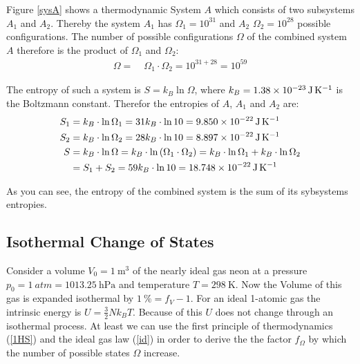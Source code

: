 \documentclass[11pt,a4paper]{scrartcl}
\newcommand{\Ln}[1]{\text{ln}\left( #1 \right)}			%
\newcommand{\eref}[1]{(\ref{#1})}						%
\begin{document}
Figure \ref{sysA} shows a thermodynamic System $A$ which consists of two subsystems $A_1$ and $A_2$. 
Thereby the system $A_1$ has $\Omega_1=10^{31}$ and $A_2$ $\Omega_2=10^{28}$ possible configurations. 
The number of possible configurations $\Omega$ of the combined system $A$ therefore is the product of $\Omega_1$ and $\Omega_2$:
\begin{align}
\Omega 
	=&\; \Omega_1\cdot\Omega_2 
	= 10^{31+28} = 10^{59}
	\label{omega}
\end{align}

The entropy of such a system is $S=k_B \ln \Omega$, where $k_B=\SI{1.38E-23}{\joule\per\kelvin}$ is the Boltzmann constant. 
Therefor the entropies of $A$, $A_1$ and $A_2$ are:
\begin{align}
S_1 
	=&\; k_B\cdot \ln\Omega_1 
	= 31 k_B\cdot\ln 10  
	= \SI{9.850E-22}{\joule\per\kelvin}
	\label{S1}\\
S_2 
	=&\; k_B\cdot \ln\Omega_2 
	= 28 k_B\cdot\ln 10 
	= \SI{8.897E-22}{\joule\per\kelvin}
	\label{S2}\\
S 
	=&\; k_B\cdot \ln\Omega 
	= k_B\cdot\Ln{\Omega_1\cdot\Omega_2} 
	= k_B\cdot\ln\Omega_1+k_B\cdot\ln\Omega_2
	\nonumber\\
=&\; S_1+S_2 
	= 59 k_B\cdot\ln 10 
	= \SI{18.748E-22}{\joule\per\kelvin}
	\label{S}
\end{align}

As you can see, the entropy of the combined system is the sum of its sybsystems entropies.\\

\subsection{Isothermal Change of States}

Consider a volume $V_0=\SI{1}{\metre\cubed}$ of the nearly ideal gas neon at a pressure $p_0=\SI{1}{atm}=\SI{1013.25}{\hecto\pascal}$ and temperature $T=\SI{298}{\kelvin}$. 
Now the Volume of this gas is expanded isothermal by $\SI{1}{\percent}=f_V-1$. 
For an ideal 1-atomic gas the intrinsic energy is $U=\frac{3}{2}Nk_BT$. 
Because of this $U$ does not change through an isothermal process.
At least we can use the first principle of thermodynamics \eref{1HS} and the ideal gas law \eref{id} in order to derive the the factor $f_\Omega$ by which the number of possible states $\Omega$ increase. 
\end{document}
